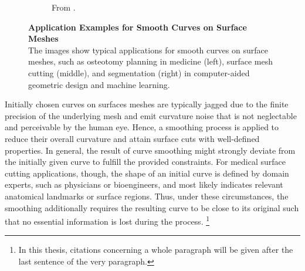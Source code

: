\documentclass{stdlocal}
\begin{document}
\begin{figure}[b]
\begin{subfigure}[b]{0.32\linewidth}
    \caption{From \textcite{ji2006}.}
    \label{fig:introduction-examples-ji2006}
  \end{subfigure}
  \caption[Application Examples for Smooth Curves on Surface Meshes]{%
    \textbf{Application Examples for Smooth Curves on Surface Meshes}\\
    The images show typical applications for smooth curves on surface meshes, such as osteotomy planning in medicine (left), surface mesh cutting (middle), and segmentation (right) in computer-aided geometric design and machine learning.
  }
  \label{fig:introduction-examples}
\end{figure}

Initially chosen curves on surfaces meshes are typically jagged due to the finite precision of the underlying mesh and emit curvature noise that is not neglectable and perceivable by the human eye.
Hence, a smoothing process is applied to reduce their overall curvature and attain surface cuts with well-defined properties.
In general, the result of curve smoothing might strongly deviate from the initially given curve to fulfill the provided constraints.
For medical surface cutting applications, though, the shape of an initial curve is defined by domain experts, such as physicians or bioengineers, and most likely indicates relevant anatomical landmarks or surface regions.
Thus, under these circumstances, the smoothing additionally requires the resulting curve to be close to its original such that no essential information is lost during the process.
\autocite{lawonn2014}\footnote{In this thesis, citations concerning a whole paragraph will be given after the last sentence of the very paragraph.}

\end{document}
